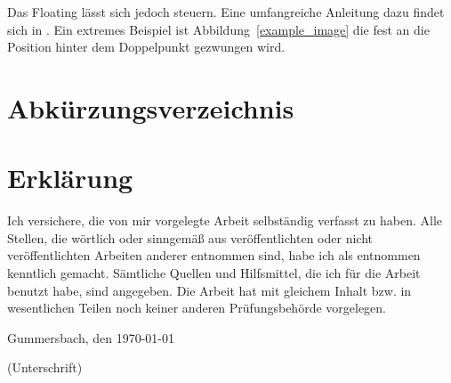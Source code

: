 \documentclass[12pt,oneside,a4paper,bibtotoc,liststotoc]{scrreprt}
\begin{document}
Das Floating lässt sich jedoch steuern. Eine umfangreiche Anleitung
dazu findet sich in \cite[][]{WikibookFloats}. Ein extremes Beispiel
ist Abbildung~\ref{example_image} die fest an die Position hinter dem
Doppelpunkt gezwungen wird.

\chapter*{Abkürzungsverzeichnis}
\begin{acronym}[Acronms]

\end{acronym}

{}

\listoffigures

\listoftables

\lstlistoflistings


\appendix

\chapter{Erklärung}

Ich versichere, die von mir vorgelegte Arbeit selbständig verfasst zu
haben. Alle Stellen, die wörtlich oder sinngemäß aus veröffentlichten
oder nicht veröffentlichten Arbeiten anderer entnommen sind, habe ich
als entnommen kenntlich gemacht. Sämtliche Quellen und Hilfsmittel,
die ich für die Arbeit benutzt habe, sind angegeben. Die Arbeit hat
mit gleichem Inhalt bzw. in wesentlichen Teilen noch keiner anderen
Prüfungsbehörde vorgelegen.

\bigskip

Gummersbach, den \today

\bigskip

\bigskip

\bigskip

\bigskip

\bigskip

\bigskip

(Unterschrift)
\end{document}
